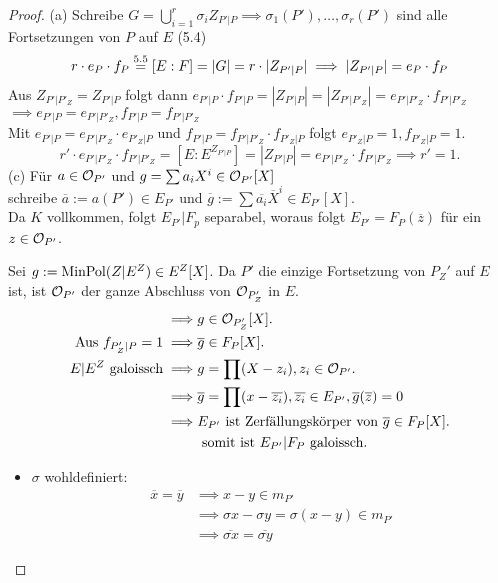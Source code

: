 \begin{proof}
    (a) Schreibe $G = \bigcup\limits_{i=1}^r \sigma_i Z_{P'|P} \implies \sigma_1(P'),\ldots,\sigma_r(P')$ sind alle Fortsetzungen
    von $P$ auf $E$ (5.4)
    $$ r \cdot e_P \cdot f_P \stackrel{5.5}{=} [E:F] = |G| = r \cdot |Z_{P'|P}| \implies |Z_{P'|P}| = e_P \cdot f_P$$
    Aus $Z_{P'|P'_Z} = Z_{P'|P}$ folgt dann $e_{P'|P} \cdot f_{P'|P} = |Z_{P'|P}| = |Z_{P'|P'_Z}| = e_{P'|P'_Z} \cdot f_{P'|P'_Z}$
    $ \implies e_{P'|P} = e_{P'|P'_Z}, f_{P'|P} = f_{P'|P'_Z}$\\
    Mit $e_{P'|P} = e_{P'|P'_Z} \cdot e_{P'_Z|P}$ und $f_{P'|P} = f_{P'|P'_Z}\cdot f_{P'_Z|P}$ folgt $e_{P'_Z|P} = 1, f_{P'_Z|P} = 1$.
    $$ r' \cdot e_{P'|P'_Z}\cdot f_{P'|P'_Z} = [E:E^{Z_{P'|P}}] = |Z_{P'|P}| = e_{P'|P'_Z} \cdot f_{P'|P'_Z} \implies r' = 1. $$
    (c) Für $a \in \mathcal{O}_{P'}$ und $g= \sum a_i X^i \in \mathcal{O}_{P'}[X]$\\ 
    schreibe $\overline{a} := a(P') \in E_{P'}$ und $\overline{g} := \sum \overline{a_i} \overline{X}^i \in E_{P'}[X]$.\\
    Da $K$ vollkommen, folgt $E_{P'} | F_p$ separabel, woraus folgt $E_{P'} = F_P(\overline{z})$ für ein $z \in \mathcal{O}_{P'}$.

    Sei $g := \operatorname{MinPol}(Z|E^Z) \in E^Z[X]$. Da $P'$ die einzige Fortsetzung von $P_Z'$ auf $E$ ist, ist $\mathcal{O}_{P'}$ der ganze Abschluss von
    $\mathcal{O}_{P_Z'}$ in $E$.
    \begin{align*}
        \implies & g \in \mathcal{O}_{P_Z'}[X]. \\
        \text{Aus } f_{P'_Z|P} = 1 \implies & \overline{g}\in F_P[X].\\
        E|E^Z \text{ galoissch} \implies & g = \prod (X-z_i), z_i \in \mathcal{O}_{P'}.\\
        \implies & \overline{g} = \prod (x - \overline{z_i}), \overline{z_i} \in E_{P'}, \overline{g}(\overline{z}) = 0\\
        \implies & E_{P'} \text{ ist Zerfällungskörper von } \overline{g} \in F_P[X]. \\
        & \text{ somit ist } E_{P'}|F_P \text{ galoissch}.
    \end{align*}
    \begin{itemize}
        \item $\sigma$ wohldefiniert: 
        \begin{align*}
            \overline{x} = \overline{y} & \implies x-y \in m_{P'}\\
            & \implies \sigma x - \sigma y = \sigma (x-y) \in m_{P'}\\
            & \implies \overline{\sigma x} = \overline{\sigma y}
        \end{align*}


\end{itemize}
\end{proof}
